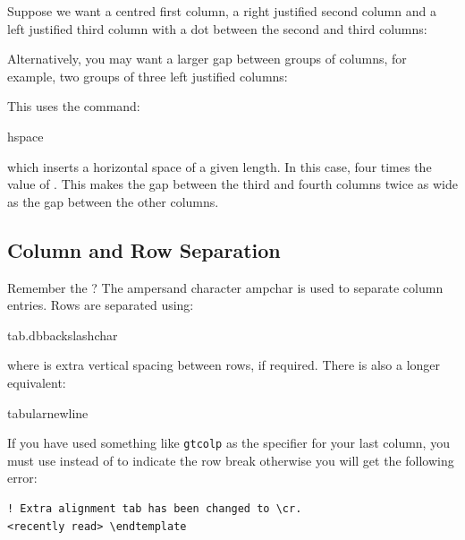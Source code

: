 
Suppose we want a centred first column, a right justified second
column and a left justified third column with a dot between the
second and third columns:
\begin{codeS}
\begin{alltt}
\end{alltt}
\end{codeS}
Alternatively, you may want a larger gap between groups of columns,
for example, two groups of three left justified columns:
\begin{codeS}
\begin{alltt}
\end{alltt}
\end{codeS}
This uses the command:
\begin{definition}
\gls{hspace}
\end{definition}
which inserts a horizontal space of a given \gls{length}. In this
case, four times the value of . This makes the gap
between the third and fourth columns twice as wide as the gap
between the other columns.

\subsection{Column and Row Separation}
\label{sec:rowscols}

Remember the ?
The ampersand character \gls{ampchar} is used to separate column
entries. Rows are separated using:
\begin{definition}
\gls{tab.dbbackslashchar}
\end{definition}
where  is extra vertical spacing between rows,
if required. There is also a longer equivalent:
\begin{definition}
\gls{tabularnewline}
\end{definition}
%
If you have used something like
\texttt{\gls{gtcol}p}
as the specifier for your last column, you must use
 instead of 
to indicate the row break otherwise you will get the following
error:
\begin{verbatim}
! Extra alignment tab has been changed to \cr.
<recently read> \endtemplate
\end{verbatim}
\screenpagebreak

